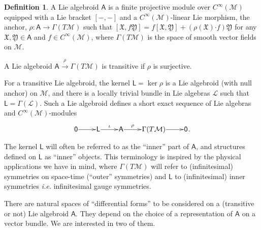\documentclass[number]{elsarticle}
\theoremstyle{definition}
\newtheorem{definition}[theorem]{Definition}
\theoremstyle{remark}
\numberwithin{equation}{section}
\begin{document}
\begin{definition}
\label{def-liealgebroidalgebraic}
A Lie algebroid ${{{{\mathbf{\mathsf{{A}}}}}}}$ is a finite projective module over $C^\infty({{{{\mathcal{{M}}}}}})$ equipped with a Lie bracket $[-,-]$ and a $C^\infty({{{{\mathcal{{M}}}}}})$-linear Lie morphism, the anchor, $\rho : {{{{\mathbf{\mathsf{{A}}}}}}} \rightarrow \Gamma(T{{{{\mathcal{{M}}}}}})$ such that $[{{\mathfrak X}}, f {{\mathfrak Y}}] = f [{{\mathfrak X}}, {{\mathfrak Y}}] + (\rho({{\mathfrak X}}){\mathord{\cdot}} f) {{\mathfrak Y}}$ for any ${{\mathfrak X}}, {{\mathfrak Y}} \in {{{{\mathbf{\mathsf{{A}}}}}}}$ and $f \in C^\infty({{{{\mathcal{{M}}}}}})$, where $\Gamma(T{{{{\mathcal{{M}}}}}})$ is the space of smooth vector fields on ${{{{\mathcal{{M}}}}}}$. 

A Lie algebroid ${{{{\mathbf{\mathsf{{A}}}}}}} \xrightarrow{\rho} \Gamma(T{{{{\mathcal{{M}}}}}})$ is transitive if $\rho$ is surjective.
\end{definition}

For a transitive Lie algebroid, the kernel ${{{{\mathbf{\mathsf{{L}}}}}}} = \ker \rho$ is a Lie algebroid (with null anchor) on ${{{{\mathcal{{M}}}}}}$, and there is a locally trivial bundle in Lie algebras ${{{{\mathcal{{L}}}}}}$ such that ${{{{\mathbf{\mathsf{{L}}}}}}} = \Gamma({{{{\mathcal{{L}}}}}})$. Such a Lie algebroid defines a short exact sequence of Lie algebras and $C^\infty({{{{\mathcal{{M}}}}}})$-modules
\begin{equation}
\label{eq-sectransitiveliealgebroid}
\xymatrix@1{{{{{\mathsf{{0}}}}}} \ar[r] & {{{{\mathbf{\mathsf{{L}}}}}}} \ar[r]^-{\iota} & {{{{\mathbf{\mathsf{{A}}}}}}} \ar[r]^-{\rho} & {\Gamma(T{{{{\mathcal{{M}}}}}})} \ar[r] & {{{{\mathsf{{0}}}}}}}.
\end{equation}

The kernel ${{{{\mathbf{\mathsf{{L}}}}}}}$ will often be referred to as the ``inner'' part of ${{{{\mathbf{\mathsf{{A}}}}}}}$, and structures defined on ${{{{\mathbf{\mathsf{{L}}}}}}}$ as ``inner'' objects. This terminology is inspired by the physical applications we have in mind, where $\Gamma(T{{{{\mathcal{{M}}}}}})$ will refer to (infinitesimal) symmetries on space-time (``outer'' symmetries) and ${{{{\mathbf{\mathsf{{L}}}}}}}$ to (infinitesimal) inner symmetries \textsl{i.e.} infinitesimal gauge symmetries.

There are natural spaces of ``differential forms'' to be considered on a (transitive or not) Lie algebroid ${{{{\mathbf{\mathsf{{A}}}}}}}$. They depend on the choice of a representation of ${{{{\mathbf{\mathsf{{A}}}}}}}$ on a vector bundle. We are interested in two of them. 
\end{document}
